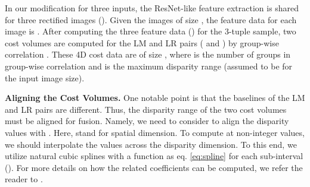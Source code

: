 \documentclass[10pt,twocolumn,letterpaper]{article}
\begin{document}
In our modification for three inputs, the ResNet-like feature extraction \cite{chang2018pyramid, guo2019group} is shared for three rectified images (). Given the images of size , the feature data for each image is . After computing the three feature data () for the 3-tuple sample, two cost volumes are computed for the LM and LR pairs ( and ) by group-wise correlation \cite{guo2019group}. These 4D cost data are of size , where  is the number of groups in group-wise correlation and  is the maximum disparity range (assumed to be  for the input image size).

\noindent\textbf{Aligning the Cost Volumes.} One notable point is that the baselines of the LM and LR pairs are different. Thus, the disparity range of the two cost volumes must be aligned for fusion. Namely, we need to consider  to align the disparity values with . Here,  stand for spatial dimension. To compute  at non-integer values, we should interpolate the values across the disparity dimension. To this end, we utilize natural cubic splines with a function as eq. \ref{eq:spline} for each sub-interval  (). For more details on how the related coefficients can be computed, we refer the reader to \cite{mckinley1998cubic}.
\end{document}
